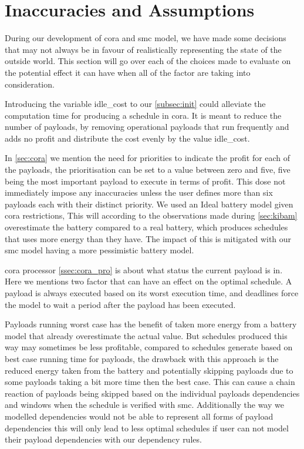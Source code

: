 \section{Inaccuracies and Assumptions}
During our development of \gls{cora} and \gls{smc} model, we have made some decisions that may not always be in favour of realistically representing the state of the outside world. This section will go over each of the choices made to evaluate on the potential effect it can have when all of the factor are taking into consideration.

Introducing the variable idle\_cost to our  \cref{subsec:init} could alleviate the computation time for producing a schedule in \gls{cora}. It is meant to reduce the number of payloads, by removing operational payloads that run frequently and adds no profit and distribute the cost evenly by the value idle\_cost.

In \cref{sec:cora} we mention the need for priorities to indicate the profit for each of the payloads, the prioritisation can be set to a value between zero and five, five being the most important payload to execute in terms of profit. This dose not immediately impose any inaccuracies unless the user defines more than six payloads each with their distinct priority.
We used an Ideal battery model given \gls{cora} restrictions, This will according to the observations made during \cref{sec:kibam} overestimate the battery compared to a real battery, which produces schedules that uses more energy than they have. The impact of this is mitigated with our \gls{smc} model having a more pessimistic battery model.

\gls{cora} processor \cref{ssec:cora_pro} is about what status the current payload is in. Here we mentions two factor that can have an effect on the optimal schedule. A payload is always executed based on its worst execution time, and deadlines force the model to wait a period after the payload has been executed. 

Payloads running worst case has the benefit of taken more energy from a battery model that already overestimate the actual value. But schedules produced this way may sometimes be less profitable, compared to schedules generate based on best case running time for payloads, the drawback with this approach is the reduced energy taken from the battery and potentially skipping payloads due to some payloads taking a bit more time then the best case. This can cause a chain reaction of payloads being skipped based on the individual payloads dependencies and windows when the schedule is verified with \gls{smc}. Additionally the way we modelled dependencies would not be able to represent all forms of payload dependencies this will only lead to less optimal schedules if user can not model their payload dependencies with our dependency rules.

